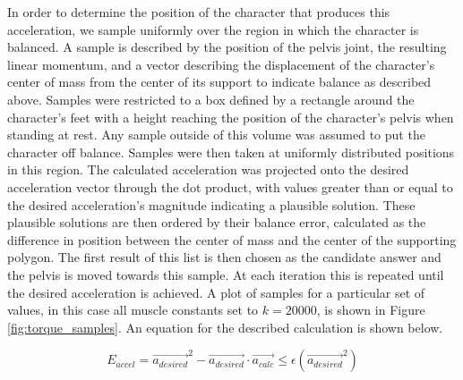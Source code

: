 In order to determine the position of the character that produces this acceleration, we sample uniformly over the region in which the character is balanced.   A sample is described by the position of the pelvis joint, the resulting linear momentum, and a vector describing the displacement of the character's center of mass from the center of its support to indicate balance as described above.  Samples were restricted to a box defined by a rectangle around the character's feet with a height reaching the position of the character's pelvis when standing at rest.  Any sample outside of this volume was assumed to put the character off balance.  Samples were then taken at uniformly distributed positions in this region.  The calculated acceleration was projected onto the desired acceleration vector through the dot product, with values greater than or equal to the desired acceleration's magnitude indicating a plausible solution.  These plausible solutions are then ordered by their balance error, calculated as the difference in position between the center of mass and the center of the supporting polygon.  The first result of this list is then chosen as the candidate answer and the pelvis is moved towards this sample.  At each iteration this is repeated until the desired acceleration is achieved.  A plot of samples for a particular set of values, in this case all muscle constants set to $k=20000$, is shown in Figure \ref{fig:torque_samples}.  An equation for the described calculation is shown below.

\[
	E_{accel} = \vec{a_{desired}}^2 - \vec{a_{desired}} \cdot \vec{a_{calc}} \le \epsilon \left(\vec{a_{desired}}^2\right)
\]

